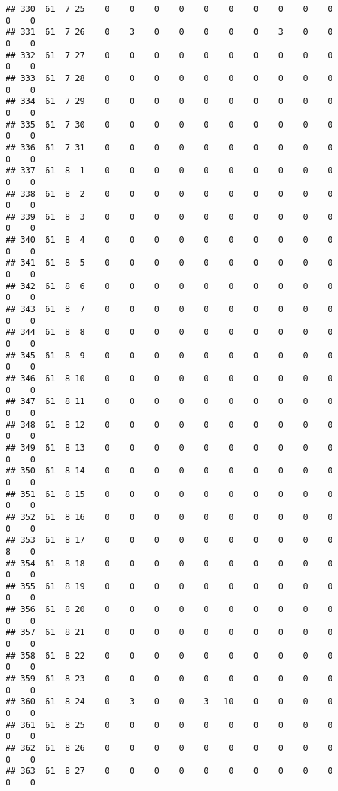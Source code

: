 \documentclass[]{article}
\begin{document}
\begin{verbatim}
## 330  61  7 25    0    0    0    0    0    0    0    0    0    0    0    0
## 331  61  7 26    0    3    0    0    0    0    0    3    0    0    0    0
## 332  61  7 27    0    0    0    0    0    0    0    0    0    0    0    0
## 333  61  7 28    0    0    0    0    0    0    0    0    0    0    0    0
## 334  61  7 29    0    0    0    0    0    0    0    0    0    0    0    0
## 335  61  7 30    0    0    0    0    0    0    0    0    0    0    0    0
## 336  61  7 31    0    0    0    0    0    0    0    0    0    0    0    0
## 337  61  8  1    0    0    0    0    0    0    0    0    0    0    0    0
## 338  61  8  2    0    0    0    0    0    0    0    0    0    0    0    0
## 339  61  8  3    0    0    0    0    0    0    0    0    0    0    0    0
## 340  61  8  4    0    0    0    0    0    0    0    0    0    0    0    0
## 341  61  8  5    0    0    0    0    0    0    0    0    0    0    0    0
## 342  61  8  6    0    0    0    0    0    0    0    0    0    0    0    0
## 343  61  8  7    0    0    0    0    0    0    0    0    0    0    0    0
## 344  61  8  8    0    0    0    0    0    0    0    0    0    0    0    0
## 345  61  8  9    0    0    0    0    0    0    0    0    0    0    0    0
## 346  61  8 10    0    0    0    0    0    0    0    0    0    0    0    0
## 347  61  8 11    0    0    0    0    0    0    0    0    0    0    0    0
## 348  61  8 12    0    0    0    0    0    0    0    0    0    0    0    0
## 349  61  8 13    0    0    0    0    0    0    0    0    0    0    0    0
## 350  61  8 14    0    0    0    0    0    0    0    0    0    0    0    0
## 351  61  8 15    0    0    0    0    0    0    0    0    0    0    0    0
## 352  61  8 16    0    0    0    0    0    0    0    0    0    0    0    0
## 353  61  8 17    0    0    0    0    0    0    0    0    0    0    8    0
## 354  61  8 18    0    0    0    0    0    0    0    0    0    0    0    0
## 355  61  8 19    0    0    0    0    0    0    0    0    0    0    0    0
## 356  61  8 20    0    0    0    0    0    0    0    0    0    0    0    0
## 357  61  8 21    0    0    0    0    0    0    0    0    0    0    0    0
## 358  61  8 22    0    0    0    0    0    0    0    0    0    0    0    0
## 359  61  8 23    0    0    0    0    0    0    0    0    0    0    0    0
## 360  61  8 24    0    3    0    0    3   10    0    0    0    0    0    0
## 361  61  8 25    0    0    0    0    0    0    0    0    0    0    0    0
## 362  61  8 26    0    0    0    0    0    0    0    0    0    0    0    0
## 363  61  8 27    0    0    0    0    0    0    0    0    0    0    0    0

\end{verbatim}
\end{document}
